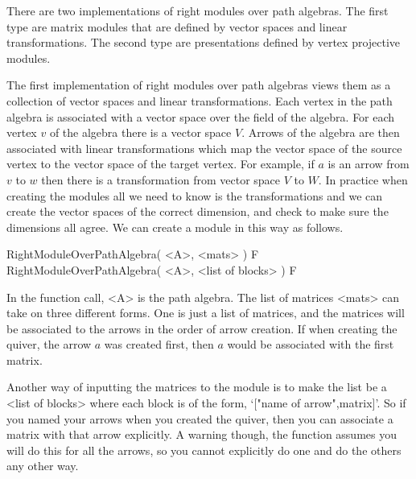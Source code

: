 %
%
%


There are two implementations of right modules over path algebras.
The first type are matrix modules that are defined by vector spaces and
linear transformations.  The second type are presentations defined by
vertex projective modules.


The first implementation of right modules over path algebras views 
them as a collection of vector spaces and linear transformations.  
Each vertex in the path algebra is associated with a vector space over 
the field of the algebra.  For each vertex $v$ of the algebra  
there is a vector space $V$.  Arrows of the algebra are 
then associated with linear transformations which map the vector space
of the source vertex to the vector space of the target vertex.  
For example, if $a$ is an arrow from $v$ to $w$ then 
there is a transformation from vector space $V$ to $W$.  
In practice when creating the modules all we need to know is the 
transformations and we can create the vector spaces of the correct 
dimension, and check to make sure the dimensions all agree.  
We can create a module in this way as follows.  

\>RightModuleOverPathAlgebra( <A>, <mats> ) F
\>RightModuleOverPathAlgebra( <A>, <list of blocks> ) F

In the function call, <A> is the path algebra.  The list of matrices 
<mats> can take on three different forms.  One is just a list of matrices, 
and the matrices will be associated to the arrows in the order of 
arrow creation.  If when creating the quiver, the arrow $a$ was 
created first, then $a$ would be associated with the first matrix. 

Another way of inputting the matrices to the module is to make the 
list be a <list of blocks> where each block is of the form, `["name of arrow",matrix]'.  
So if you named your arrows when you created the quiver, then you can 
associate a matrix with that arrow explicitly.  A warning though, the 
function assumes you will do this for all the arrows, so you cannot 
explicitly do one and do the others any other way.  

